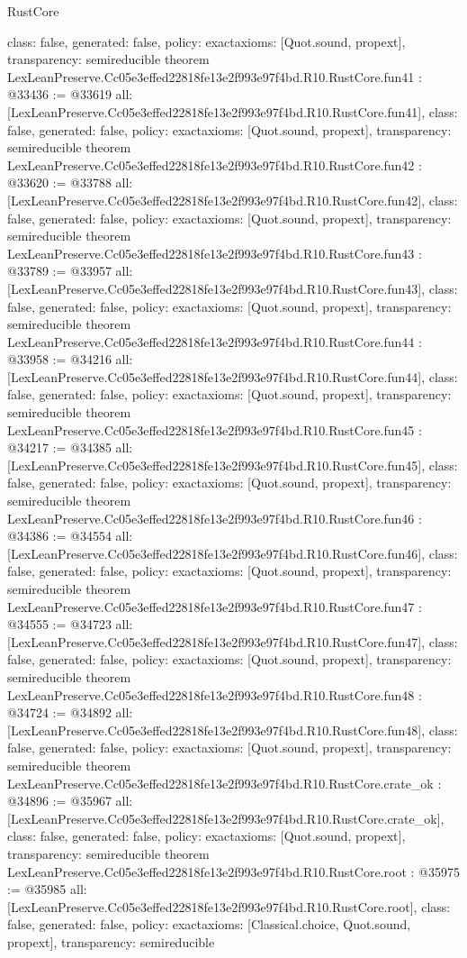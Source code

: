 \begin{lexlean}{RustCore}
\begin{coremodule}
{  class: false,
  generated: false,
  policy: exact{axioms: [Quot.sound, propext]},
  transparency: semireducible
}
theorem LexLeanPreserve.Cc05e3effed22818fe13e2f993e97f4bd.R10.RustCore.fun41 : @33436 := @33619 {
  all: [LexLeanPreserve.Cc05e3effed22818fe13e2f993e97f4bd.R10.RustCore.fun41],
  class: false,
  generated: false,
  policy: exact{axioms: [Quot.sound, propext]},
  transparency: semireducible
}
theorem LexLeanPreserve.Cc05e3effed22818fe13e2f993e97f4bd.R10.RustCore.fun42 : @33620 := @33788 {
  all: [LexLeanPreserve.Cc05e3effed22818fe13e2f993e97f4bd.R10.RustCore.fun42],
  class: false,
  generated: false,
  policy: exact{axioms: [Quot.sound, propext]},
  transparency: semireducible
}
theorem LexLeanPreserve.Cc05e3effed22818fe13e2f993e97f4bd.R10.RustCore.fun43 : @33789 := @33957 {
  all: [LexLeanPreserve.Cc05e3effed22818fe13e2f993e97f4bd.R10.RustCore.fun43],
  class: false,
  generated: false,
  policy: exact{axioms: [Quot.sound, propext]},
  transparency: semireducible
}
theorem LexLeanPreserve.Cc05e3effed22818fe13e2f993e97f4bd.R10.RustCore.fun44 : @33958 := @34216 {
  all: [LexLeanPreserve.Cc05e3effed22818fe13e2f993e97f4bd.R10.RustCore.fun44],
  class: false,
  generated: false,
  policy: exact{axioms: [Quot.sound, propext]},
  transparency: semireducible
}
theorem LexLeanPreserve.Cc05e3effed22818fe13e2f993e97f4bd.R10.RustCore.fun45 : @34217 := @34385 {
  all: [LexLeanPreserve.Cc05e3effed22818fe13e2f993e97f4bd.R10.RustCore.fun45],
  class: false,
  generated: false,
  policy: exact{axioms: [Quot.sound, propext]},
  transparency: semireducible
}
theorem LexLeanPreserve.Cc05e3effed22818fe13e2f993e97f4bd.R10.RustCore.fun46 : @34386 := @34554 {
  all: [LexLeanPreserve.Cc05e3effed22818fe13e2f993e97f4bd.R10.RustCore.fun46],
  class: false,
  generated: false,
  policy: exact{axioms: [Quot.sound, propext]},
  transparency: semireducible
}
theorem LexLeanPreserve.Cc05e3effed22818fe13e2f993e97f4bd.R10.RustCore.fun47 : @34555 := @34723 {
  all: [LexLeanPreserve.Cc05e3effed22818fe13e2f993e97f4bd.R10.RustCore.fun47],
  class: false,
  generated: false,
  policy: exact{axioms: [Quot.sound, propext]},
  transparency: semireducible
}
theorem LexLeanPreserve.Cc05e3effed22818fe13e2f993e97f4bd.R10.RustCore.fun48 : @34724 := @34892 {
  all: [LexLeanPreserve.Cc05e3effed22818fe13e2f993e97f4bd.R10.RustCore.fun48],
  class: false,
  generated: false,
  policy: exact{axioms: [Quot.sound, propext]},
  transparency: semireducible
}
theorem LexLeanPreserve.Cc05e3effed22818fe13e2f993e97f4bd.R10.RustCore.crate_ok : @34896 := @35967 {
  all: [LexLeanPreserve.Cc05e3effed22818fe13e2f993e97f4bd.R10.RustCore.crate_ok],
  class: false,
  generated: false,
  policy: exact{axioms: [Quot.sound, propext]},
  transparency: semireducible
}
theorem LexLeanPreserve.Cc05e3effed22818fe13e2f993e97f4bd.R10.RustCore.root : @35975 := @35985 {
  all: [LexLeanPreserve.Cc05e3effed22818fe13e2f993e97f4bd.R10.RustCore.root],
  class: false,
  generated: false,
  policy: exact{axioms: [Classical.choice, Quot.sound, propext]},
  transparency: semireducible
}


\end{coremodule}
\end{lexlean}
